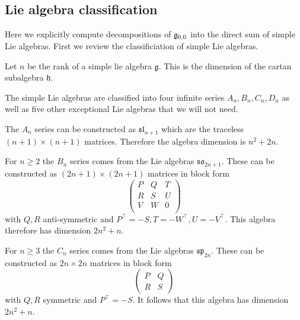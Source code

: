 


\subsection{Lie algebra classification}

Here we explicitly compute decompositions of $\mathfrak{g}_{0,0}$
into the direct sum of simple Lie algebras.
First we review the classificiation of simple Lie algebras.

Let $n$ be the rank of a simple lie algebra $\mathfrak{g}.$
This is the dimension of the cartan subalgebra $\mathfrak{h}.$

The simple Lie algebras are classified into four infinite series
$A_n, B_n, C_n, D_n$ as well as five other exceptional Lie
algebras that we will not need.

The $A_n$ series can be
constructed as 
$\mathfrak{sl}_{n+1}$ which are the traceless $(n+1)\times (n+1)$ matrices. 
Therefore the algebra dimension is $n^2 + 2n.$

For $n\ge 2$ the $B_n$ series 
comes from the Lie algebras
$\mathfrak{so}_{2n+1}$.
These can be constructed as $(2n+1)\times(2n+1)$ matrices
in block form 
$$
\left(\begin{array}{lll}
P & Q & T\\
R & S & U\\
V & W & 0\\
\end{array}\right)
$$
with $Q,R$ anti-symmetric and 
$P^{\top}=-S,T=-W^{\top},U=-V^{\top}.$
This algebra therefore has dimension $2n^2 + n.$

For $n\ge 3$ the $C_n$ series
comes from the Lie algebras
$\mathfrak{sp}_{2n}$.
These can be constructed as $2n\times2n$ matrices
in block form 
$$
\left(\begin{array}{ll}
P & Q \\
R & S
\end{array}\right)
$$
with 
$Q,R$ symmetric and $P^{\top}=-S.$
It follows that this algebra has dimension $2n^2 + n.$

